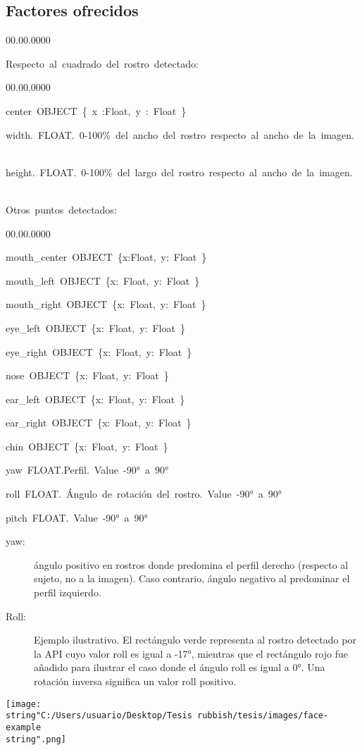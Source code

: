 \subsection*{Factores ofrecidos}
\begin{lyxlist}{00.00.0000}
\item [{Respecto~al~cuadrado~del~rostro~detectado:}]~

\begin{lyxlist}{00.00.0000}
\item [{center~OBJECT~\{~x~:Float,~y~:~Float~\}}]~
\item [{width.~FLOAT.~0-100\%~del~ancho~del~rostro~respecto~al~ancho~de~la~imagen.}]~
\item [{height.~FLOAT.~0-100\%~del~largo~del~rostro~respecto~al~ancho~de~la~imagen.}]~
\end{lyxlist}
\item [{Otros~puntos~detectados:}]~

\begin{lyxlist}{00.00.0000}
\item [{mouth\_center~OBJECT~\{x:Float,~y:~Float~\}}]~
\item [{mouth\_left~OBJECT~\{x:~Float,~y:~Float~\}}]~
\item [{mouth\_right~OBJECT~\{x:~Float,~y:~Float~\}}]~
\item [{eye\_left~OBJECT~\{x:~Float,~y:~Float~\}}]~
\item [{eye\_right~OBJECT~\{x:~Float,~y:~Float~\}}]~
\item [{nose~OBJECT~\{x:~Float,~y:~Float~\}}]~
\item [{ear\_left~OBJECT~\{x:~Float,~y:~Float~\}}]~
\item [{ear\_right~OBJECT~\{x:~Float,~y:~Float~\}}]~
\item [{chin~OBJECT~\{x:~Float,~y:~Float~\}}]~
\item [{yaw~FLOAT.Perfil.~Value~-90°~a~90°}]~
\item [{roll~FLOAT.~Ángulo~de~rotación~del~rostro.~Value~-90°~a~90°}]~
\item [{pitch~FLOAT.~Value~-90°~a~90°}]~
\end{lyxlist}
\end{lyxlist}
\begin{description}
\item [{yaw:}] ángulo positivo en rostros donde predomina el perfil derecho
(respecto al sujeto, no a la imagen). Caso contrario, ángulo negativo
al predominar el perfil izquierdo. 
\item [{Roll:}] Ejemplo ilustrativo. El rectángulo verde representa al
rostro detectado por la API cuyo valor roll es igual a -17°, mientras
que el rectángulo rojo fue añadido para ilustrar el caso donde el
ángulo roll es igual a 0°. Una rotación inversa significa un valor
roll positivo. 
\item [{\texttt{[image: \\string"C:/Users/usuario/Desktop/Tesis rubbish/tesis/images/face-example\\string".png]}}]~
\end{description}

